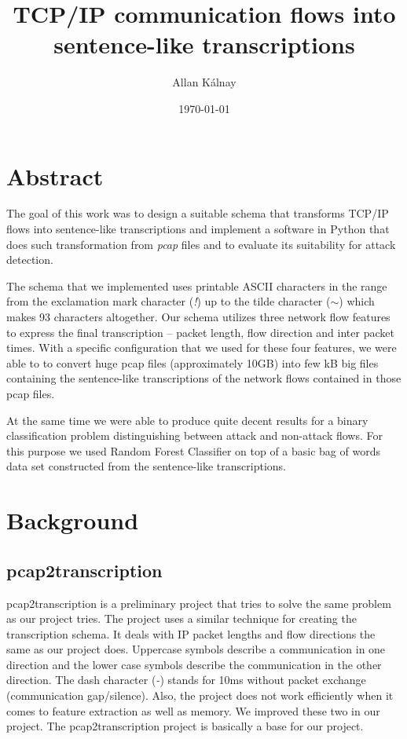 \documentclass{article}
\title{TCP/IP communication flows into sentence-like transcriptions}
\author{Allan Kálnay}
\date{\today}
\begin{document}
\sloppy

\maketitle

\section*{Abstract}
The goal of this work was to design a suitable schema that transforms TCP/IP flows into sentence-like transcriptions and implement a software in Python that does such transformation from \textit{pcap} files and to evaluate its suitability for attack detection.

The schema that we implemented uses printable ASCII characters in the range from the exclamation mark character (\textit{!}) up to the tilde character (\textit{$\sim$}) which makes 93 characters altogether. Our schema utilizes three network flow features to express the final transcription -- packet length, flow direction and inter packet times. With a specific configuration that we used for these four features, we were able to to convert huge pcap files (approximately 10GB) into few kB big files containing the sentence-like transcriptions of the network flows contained in those pcap files.

At the same time we were able to produce quite decent results for a binary classification problem distinguishing between attack and non-attack flows. For this purpose we used Random Forest Classifier on top of a basic bag of words data set constructed from the sentence-like transcriptions.

\newpage
\tableofcontents
\newpage

\section{Background}
\subsection{pcap2transcription}
pcap2transcription \cite{pcap2transcription} is a preliminary project that tries to solve the same problem as our project tries. The project uses a similar technique for creating the transcription schema. It deals with IP packet lengths and flow directions the same as our project does. Uppercase symbols describe a communication in one direction and the lower case symbols describe the communication in the other direction. The dash character (\textit{-}) stands for 10ms without packet exchange (communication gap/silence). Also, the project does not work efficiently when it comes to feature extraction as well as memory. We improved these two in our project. The pcap2transcription project is basically a base for our project.
\end{document}
